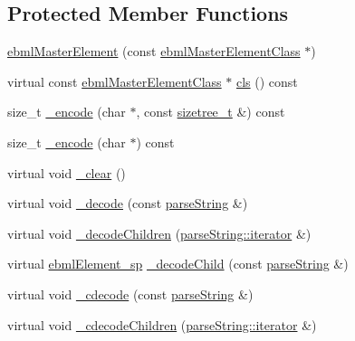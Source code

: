 \subsection*{Protected Member Functions}
\begin{DoxyCompactItemize}
\item 
\mbox{\hyperlink{classebml_1_1ebmlMasterElement_a874430a761ddf6eeb704d40136e75d33}{ebml\+Master\+Element}} (const \mbox{\hyperlink{classebml_1_1ebmlMasterElementClass}{ebml\+Master\+Element\+Class}} $\ast$)
\item 
virtual const \mbox{\hyperlink{classebml_1_1ebmlMasterElementClass}{ebml\+Master\+Element\+Class}} $\ast$ \mbox{\hyperlink{classebml_1_1ebmlMasterElement_a4073fb3f7ce3dda153384821714df29e}{cls}} () const
\item 
size\+\_\+t \mbox{\hyperlink{classebml_1_1ebmlMasterElement_ab50b9cdd8e402150cd96a19d613c98f5}{\+\_\+encode}} (char $\ast$, const \mbox{\hyperlink{structebml_1_1sizetree__t}{sizetree\+\_\+t}} \&) const
\item 
size\+\_\+t \mbox{\hyperlink{classebml_1_1ebmlMasterElement_aa0dd7215a5de90f8a52364df781952e2}{\+\_\+encode}} (char $\ast$) const
\item 
virtual void \mbox{\hyperlink{classebml_1_1ebmlMasterElement_a2fdf9fa1022f06a046fe94e631e266a3}{\+\_\+clear}} ()
\item 
virtual void \mbox{\hyperlink{classebml_1_1ebmlMasterElement_af181a3280da5c875497324955f75e62c}{\+\_\+decode}} (const \mbox{\hyperlink{classebml_1_1parseString}{parse\+String}} \&)
\item 
virtual void \mbox{\hyperlink{classebml_1_1ebmlMasterElement_ae486adb2522e8d10177c70d889c32922}{\+\_\+decode\+Children}} (\mbox{\hyperlink{classebml_1_1parseString_1_1iterator}{parse\+String\+::iterator}} \&)
\item 
virtual \mbox{\hyperlink{namespaceebml_adad533b7705a16bb360fe56380c5e7be}{ebml\+Element\+\_\+sp}} \mbox{\hyperlink{classebml_1_1ebmlMasterElement_a1486e31a30f3cfb709c66d9a06b053b9}{\+\_\+decode\+Child}} (const \mbox{\hyperlink{classebml_1_1parseString}{parse\+String}} \&)
\item 
virtual void \mbox{\hyperlink{classebml_1_1ebmlMasterElement_a71a69b9b1f5fe071ec5c91867ea520a0}{\+\_\+cdecode}} (const \mbox{\hyperlink{classebml_1_1parseString}{parse\+String}} \&)
\item 
virtual void \mbox{\hyperlink{classebml_1_1ebmlMasterElement_af4b802cb2b71b57215d6e0f25f9fa25e}{\+\_\+cdecode\+Children}} (\mbox{\hyperlink{classebml_1_1parseString_1_1iterator}{parse\+String\+::iterator}} \&)

\end{DoxyCompactItemize}
